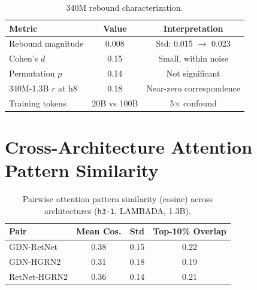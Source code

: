 \documentclass[11pt,a4paper]{article}
\begin{document}
\begin{table}[h]
\centering
\caption{340M rebound characterization.}
\label{tab:scale}
\small
\begin{tabular}{lcc}
\toprule
\textbf{Metric} & \textbf{Value} & \textbf{Interpretation} \\
\midrule
Rebound magnitude & 0.008 & Std: 0.015 $\to$ 0.023 \\
Cohen's $d$ & 0.15 & Small, within noise \\
Permutation $p$ & 0.14 & Not significant \\
340M-1.3B $r$ at h8 & 0.18 & Near-zero correspondence \\
Training tokens & 20B vs 100B & 5$\times$ confound \\
\bottomrule
\end{tabular}
\end{table}

\section{Cross-Architecture Attention Pattern Similarity}
\label{app:attn_sim}

\begin{table}[h]
\centering
\caption{Pairwise attention pattern similarity (cosine) across architectures (\texttt{h3-1}, LAMBADA, 1.3B).}
\label{tab:attn_sim}
\small
\begin{tabular}{lccc}
\toprule
\textbf{Pair} & \textbf{Mean Cos.} & \textbf{Std} & \textbf{Top-10\% Overlap} \\
\midrule
GDN-RetNet & 0.38 & 0.15 & 0.22 \\
GDN-HGRN2 & 0.31 & 0.18 & 0.19 \\
RetNet-HGRN2 & 0.36 & 0.14 & 0.21 \\
\bottomrule
\end{tabular}
\end{table}



\end{document}
